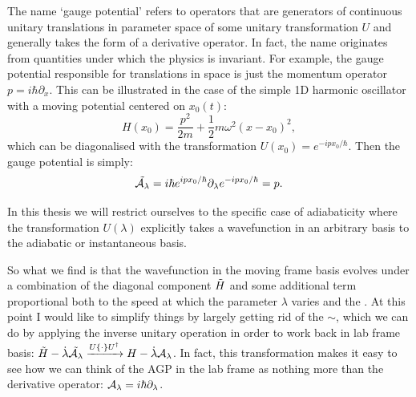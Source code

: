     The name `gauge potential' refers to operators that are generators of continuous unitary translations in parameter space \cite{kolodrubetz_geometry_2017} of some unitary transformation $U$ and generally takes the form of a derivative operator. In fact, the name originates from quantities under which the physics is invariant. For example, the gauge potential responsible for translations in space is just the momentum operator $p = i\hbar \partial_x$. This can be illustrated in the case of the simple 1D harmonic oscillator with a moving potential centered on $x_0(t)$:
    \begin{equation}\label{eq:harmonic_oscillator}
        H(x_0) = \frac{p^2}{2m} + \frac{1}{2}m \omega^2 (x - x_0)^2,
    \end{equation}
    which can be diagonalised with the transformation $U(x_0) = e^{-i p x_0/\hbar}$. Then the gauge potential is simply:
    \begin{equation}
        \Tilde{\mathcal{A}_{\lambda}} = i\hbar e^{i p x_0/\hbar} \partial_{\lambda} e^{-i p x_0/\hbar} = p.
    \end{equation}
    
    In this thesis we will restrict ourselves to the specific case of adiabaticity where the transformation $U(\lambda)$ explicitly takes a wavefunction in an arbitrary basis to the adiabatic or instantaneous basis. 
    
    So what we find is that the wavefunction in the moving frame basis evolves under a combination of the diagonal component $\Tilde{H}$ and some additional term proportional both to the speed at which the parameter $\lambda$ varies and the . At this point I would like to simplify things by largely getting rid of the $\sim$, which we can do by applying the inverse unitary operation in order to work back in lab frame basis: $\Tilde{H} - \dot{\lambda}\Tilde{\mathcal{A}_{\lambda}} \xrightarrow{U \{ \cdot \} U^{\dagger}} H - \dot{\lambda} \mathcal{A}_{\lambda}$. In fact, this transformation makes it easy to see how we can think of the AGP in the lab frame as nothing more than the derivative operator: $\mathcal{A}_{\lambda} = i\hbar\partial_{\lambda}$. 

